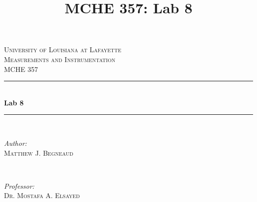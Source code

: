\documentclass[12pt]{article}
\title{MCHE 357: Lab 8}
\begin{document}




\begin{titlepage}

\newcommand{\HRule}{\rule{\linewidth}{0.5mm}} %

\center %
 

\textsc{\LARGE University of Louisiana at Lafayette}\\[1.5cm] %
\textsc{\Large Measurements and Instrumentation}\\[0.5cm] %
\textsc{\large MCHE 357}\\[0.5cm] %


\HRule \\[0.4cm]
{ \huge \bfseries Lab 8}\\[0.4cm] %
\HRule \\[1.5cm]
 

\begin{minipage}{0.4\textwidth}
\begin{flushleft} \large
\emph{Author:}\\
\textsc{Matthew J. Begneaud} \\%
\end{flushleft}
\end{minipage}
~
\begin{minipage}{0.4\textwidth}
\begin{flushright} \large
\emph{Professor:} \\
\textsc{Dr. Mostafa A. Elsayed} %
\end{flushright}
\end{minipage}\\[1.5cm]


\end{titlepage}
\end{document}
